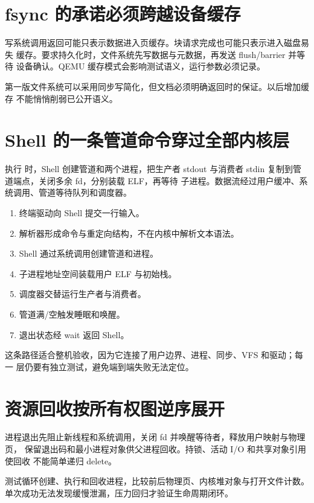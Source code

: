 \section{fsync 的承诺必须跨越设备缓存}

写系统调用返回可能只表示数据进入页缓存。块请求完成也可能只表示进入磁盘易失
缓存。要求持久化时，文件系统先写数据与元数据，再发送 flush/barrier 并等待
设备确认。QEMU 缓存模式会影响测试语义，运行参数必须记录。

第一版文件系统可以采用同步写简化，但文档必须明确返回时的保证。以后增加缓存
不能悄悄削弱已公开语义。

\section{Shell 的一条管道命令穿过全部内核层}

执行  时，Shell 创建管道和两个进程，把生产者
stdout 与消费者 stdin 复制到管道端点，关闭多余 fd，分别装载 ELF，再等待
子进程。数据流经过用户缓冲、系统调用、管道等待队列和调度器。

\begin{enumerate}[label=\arabic*.]
  \item 终端驱动向 Shell 提交一行输入。
  \item 解析器形成命令与重定向结构，不在内核中解析文本语法。
  \item Shell 通过系统调用创建管道和进程。
  \item 子进程地址空间装载用户 ELF 与初始栈。
  \item 调度器交替运行生产者与消费者。
  \item 管道满/空触发睡眠和唤醒。
  \item 退出状态经 wait 返回 Shell。
\end{enumerate}

这条路径适合整机验收，因为它连接了用户边界、进程、同步、VFS 和驱动；每一
层仍要有独立测试，避免端到端失败无法定位。

\section{资源回收按所有权图逆序展开}

进程退出先阻止新线程和系统调用，关闭 fd 并唤醒等待者，释放用户映射与物理页，
保留退出码和最小进程对象供父进程回收。持锁、活动 I/O 和共享对象引用使回收
不能简单递归 delete。

测试循环创建、执行和回收进程，比较前后物理页、内核堆对象与打开文件计数。
单次成功无法发现缓慢泄漏，压力回归才验证生命周期闭环。
